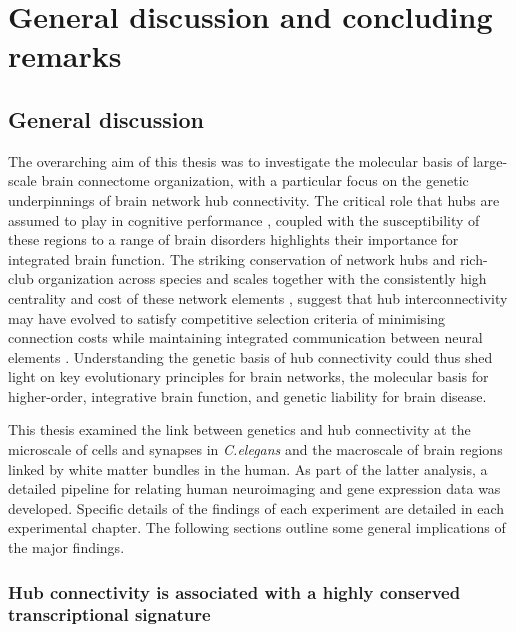 \chapter{General discussion and concluding remarks}
\label{ch:Discussion}

\section{General discussion}
The overarching aim of this thesis was to investigate the molecular basis of large-scale brain connectome organization, with a particular focus on the genetic underpinnings of brain network hub connectivity. The critical role that hubs are assumed to play in cognitive performance \citep{Buckner2009,Mesulam1998}, coupled with the susceptibility of these regions to a range of brain disorders \citep{Bassett2009a,Crossley2014,Fornito2015} highlights their importance for integrated brain function. The striking conservation of network hubs and rich-club organization across species and scales together with the consistently high centrality and cost of these network elements \citep{VandenHeuvel2016}, suggest that hub interconnectivity may have evolved to satisfy competitive selection criteria of minimising connection costs while maintaining integrated communication between neural elements \citep{Bullmore2012}. Understanding the genetic basis of hub connectivity could thus shed light on key evolutionary principles for brain networks, the molecular basis for higher-order, integrative brain function, and genetic liability for brain disease.

This thesis examined the link between genetics and hub connectivity at the microscale of cells and synapses in \textit{C.elegans} and the macroscale of brain regions linked by white matter bundles in the human. As part of the latter analysis, a detailed pipeline for relating human neuroimaging and gene expression data was developed. Specific details of the findings of each experiment are detailed in each experimental chapter. The following sections outline some general implications of the major findings.

\subsection*{Hub connectivity is associated with a highly conserved transcriptional signature}

